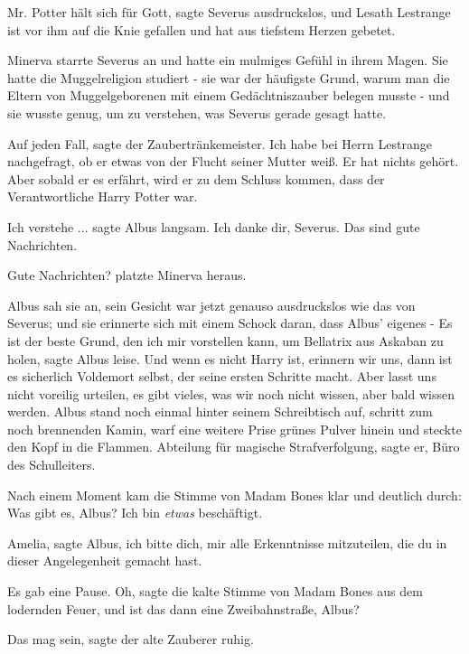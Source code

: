 \glqq{}Mr. Potter hält sich für Gott\grqq{}, sagte Severus ausdruckslos, \glqq{}
und Lesath Lestrange ist vor ihm auf die Knie gefallen und hat aus tiefstem
Herzen gebetet.\grqq{}

Minerva starrte Severus an und hatte ein mulmiges Gefühl in ihrem Magen. Sie
hatte die Muggelreligion studiert - sie war der häufigste Grund, warum man die
Eltern von Muggelgeborenen mit einem Gedächtniszauber belegen musste - und sie
wusste genug, um zu verstehen, was Severus gerade gesagt hatte.

\glqq{}Auf jeden Fall\grqq{}, sagte der Zaubertränkemeister. \glqq{}Ich habe bei
Herrn Lestrange nachgefragt, ob er etwas von der Flucht seiner Mutter weiß. Er
hat nichts gehört. Aber sobald er es erfährt, wird er zu dem Schluss kommen,
dass der Verantwortliche Harry Potter war.\grqq{}

\glqq{}Ich verstehe ...\grqq{} sagte Albus langsam. \glqq{}Ich danke dir, Severus.
Das sind gute Nachrichten.\grqq{}

\glqq{}Gute Nachrichten?\grqq{} platzte Minerva heraus.

Albus sah sie an, sein Gesicht war jetzt genauso ausdruckslos wie das von
Severus; und sie erinnerte sich mit einem Schock daran, dass Albus' eigenes -
\glqq{}Es ist der beste Grund, den ich mir vorstellen kann, um Bellatrix aus
Askaban zu holen\grqq{}, sagte Albus leise. \glqq{}Und wenn es nicht Harry ist,
erinnern wir uns, dann ist es sicherlich Voldemort selbst, der seine ersten
Schritte macht. Aber lasst uns nicht voreilig urteilen, es gibt vieles, was wir
noch nicht wissen, aber bald wissen werden.\grqq{} Albus stand noch einmal
hinter seinem Schreibtisch auf, schritt zum noch brennenden Kamin, warf eine
weitere Prise grünes Pulver hinein und steckte den Kopf in die Flammen. \glqq{}
Abteilung für magische Strafverfolgung\grqq{}, sagte er, \glqq{}Büro des
Schulleiters.\grqq{}

Nach einem Moment kam die Stimme von Madam Bones klar und deutlich durch: \glqq{}
Was gibt es, Albus? Ich bin \emph{etwas} beschäftigt.\grqq{}

\glqq{}Amelia\grqq{}, sagte Albus, \glqq{}ich bitte dich, mir alle Erkenntnisse
mitzuteilen, die du in dieser Angelegenheit gemacht hast.\grqq{}

Es gab eine Pause. \glqq{}Oh\grqq{}, sagte die kalte Stimme von Madam Bones aus
dem lodernden Feuer, \glqq{}und ist das dann eine Zweibahnstraße, Albus?\grqq{}

\glqq{}Das mag sein\grqq{}, sagte der alte Zauberer ruhig.


